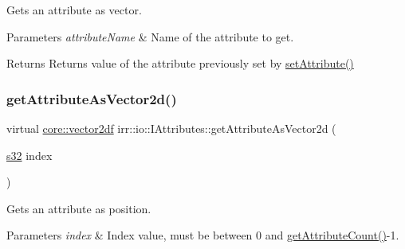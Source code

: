 Gets an attribute as vector. 


\begin{DoxyParams}{Parameters}
{\em attribute\+Name} & Name of the attribute to get. \\
\hline
\end{DoxyParams}
\begin{DoxyReturn}{Returns}
Returns value of the attribute previously set by \hyperlink{classirr_1_1io_1_1IAttributes_a03fa31acb481ae23678676cc183f09a6}{set\+Attribute()} 
\end{DoxyReturn}
\mbox{\label{classirr_1_1io_1_1IAttributes_a81fb2a12345e49b12cd6cf05968544f5}} 
\subsubsection{\texorpdfstring{get\+Attribute\+As\+Vector2d()}{getAttributeAsVector2d()}\hspace{0.1cm}{\footnotesize\ttfamily [2/2]}}
{\footnotesize\ttfamily virtual \hyperlink{namespaceirr_1_1core_a2cf08556d77f6f5a792973a6e27ed11b}{core\+::vector2df} irr\+::io\+::\+I\+Attributes\+::get\+Attribute\+As\+Vector2d (\begin{DoxyParamCaption}\item[{\hyperlink{namespaceirr_ac66849b7a6ed16e30ebede579f9b47c6}{s32}}]{index }\end{DoxyParamCaption})\hspace{0.3cm}{\ttfamily [pure virtual]}}



Gets an attribute as position. 


\begin{DoxyParams}{Parameters}
{\em index} & Index value, must be between 0 and \hyperlink{classirr_1_1io_1_1IAttributes_a796bdd9440ee7ba0b6742a90a82870b6}{get\+Attribute\+Count()}-\/1. \\
\hline
\end{DoxyParams}
\mbox{\label{classirr_1_1io_1_1IAttributes_ac4ad5d4db7fd08e0523d3f8e671c2f68}} 
